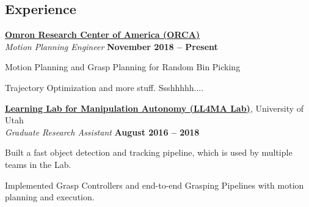 \documentclass[letterpaper, margin, line, 10.5pt]{resume}
\begin{document}
\begin{resume}
    
    \sectionseperator
    \section{\myheadingstyle Experience}
    
    \href{https://www.omron.com/global/americas/usa.html}{\textbf{Omron Research Center of America (ORCA)}} \vspace{1pt}\\\vspace{1pt}%
    \textsl{Motion Planning Engineer} \hfill \textbf{November 2018 -- Present}\\ \vspace{-4.5mm}
    \begin{list2}
    	\item Motion Planning and Grasp Planning for Random Bin Picking
    	\item Trajectory Optimization and more stuff. Ssshhhhh....
    \end{list2}\vspace{-2.25mm}

    \href{https://robot-learning.cs.utah.edu}{\textbf{Learning Lab for Manipulation Autonomy (LL4MA Lab)}}, University of Utah \vspace{1pt}\\\vspace{1pt}%
    \textsl{Graduate Research Assistant} \hfill \textbf{August 2016 -- 2018}\\ \vspace{-4.5mm}
	\begin{list2}
		\item Built a fast object detection and tracking pipeline, which is used by multiple teams in the Lab.
		\item Implemented Grasp Controllers and end-to-end Grasping Pipelines with motion planning and execution.
	\end{list2}\vspace{-0.1mm}




\end{resume}
\end{document}
